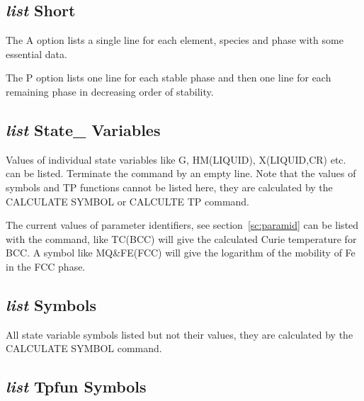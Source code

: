 \documentclass[12pt]{article}
\begin{document}
\subsection{{\em list} Short}

The A option lists a single line for each element, species and phase
with some essential data.

The P option lists one line for each stable phase and then one line
for each remaining phase in decreasing order of stability.

\subsection{{\em list} State\_ Variables}

Values of individual state variables like G, HM(LIQUID), X(LIQUID,CR)
etc. can be listed.  Terminate the command by an empty line.  Note
that the values of symbols and TP functions cannot be listed here,
they are calculated by the CALCULATE SYMBOL or CALCULTE TP command.

The current values of parameter identifiers, see
section~\ref{sc:paramid} can be listed with the command, like TC(BCC)
will give the calculated Curie temperature for BCC.  A symbol like
MQ\&FE(FCC) will give the logarithm of the mobility of Fe in the FCC
phase.

\subsection{{\em list} Symbols}

All state variable symbols listed but not their values, they are
calculated by the CALCULATE SYMBOL command.

\subsection{{\em list} Tpfun Symbols}
\end{document}
